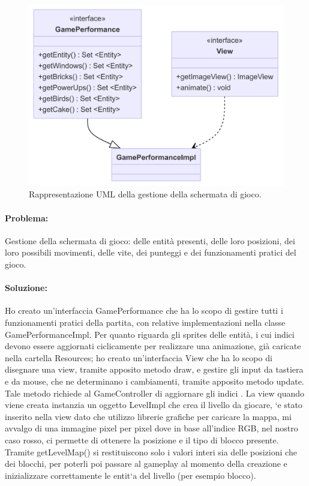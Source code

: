 \begin{figure}[H]
\centering{}
\includegraphics[width=\textwidth]{img/game.png}
\caption{Rappresentazione UML della gestione della schermata di gioco.}
\end{figure}

\paragraph{Problema:}
Gestione della schermata di gioco: delle entità presenti, delle loro posizioni, dei loro possibili movimenti, delle vite, dei punteggi e dei funzionamenti pratici del gioco.

\paragraph{Soluzione:}
Ho creato un'interfaccia GamePerformance che ha lo scopo di gestire tutti i funzionamenti pratici della partita, con relative implementazioni nella classe GamePerformanceImpl.
Per quanto riguarda gli sprites delle entità, i cui indici devono essere aggiornati ciclicamente per realizzare una animazione, già caricate nella cartella Resources; ho creato un'interfaccia View che ha lo scopo di disegnare una view, tramite apposito metodo draw, e gestire gli input da tastiera e da mouse, che ne determinano i cambiamenti, tramite apposito metodo update.
Tale metodo richiede al GameController di aggiornare gli indici .
La view quando viene creata instanzia un oggetto LevelImpl che crea il livello da giocare, `e stato inserito nella view dato che utilizzo librerie grafiche per caricare la mappa, mi avvalgo di una immagine pixel per pixel dove in base all’indice RGB, nel nostro caso rosso, ci permette di ottenere la posizione e il tipo di blocco presente. Tramite getLevelMap() si restituiscono solo i valori interi sia delle posizioni che dei blocchi, per poterli poi passare al gameplay al momento della creazione e inizializzare correttamente le entit`a del livello (per esempio blocco).

